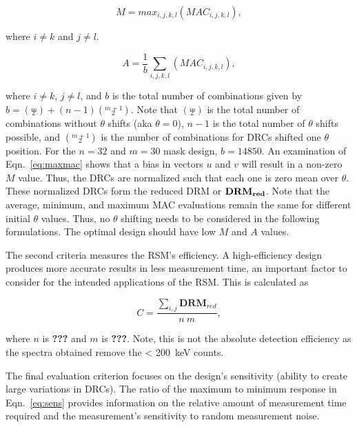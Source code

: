 \documentclass[3p,times]{elsarticle}
\begin{document}
\begin{equation}
M=max_{i,j,k,l}\left(MAC_{i,j,k,l}\right),
\label{eq:maxmac}
\end{equation}

\noindent where $i\neq k$ and $j\neq l$.

\begin{equation}
A=\frac{1}{b}\sum_{i,j,k,l}\left(MAC_{i,j,k,l}\right),
\label{eq:avgmac}
\end{equation}

where $i\neq k$, $j\neq l$, and $b$ is the total number of combinations given by $b=\left(\overset{m}{_2}\right)+(n-1)\left(\overset{m+1}{_2}\right)$.  
Note that $\left(\overset{m}{_2}\right)$ is the total number of combinations without $\theta$ shifts (aka $\theta=0$), $n-1$ is the total number of $\theta$ shifts possible, and $\left(\overset{m+1}{_2}\right)$ is the number of combinations for DRCs shifted one $\theta$ position.  
For the $n=32$ and $m=30$ mask design, $b=14850$.  
An examination of Eqn.~\ref{eq:maxmac} shows that a bias in vectors $u$ and $v$ will result in a non-zero $M$ value.  
Thus, the DRCs are normalized such that each one is zero mean over $\theta$.  
These normalized DRCs form the reduced DRM or $\bf{DRM_{red}}$. 
Note that the average, minimum, and maximum MAC evaluations remain the same for different initial $\theta$ values.  
Thus, no $\theta$ shifting needs to be considered in the following formulations. 
The optimal design should have low $M$ and $A$ values.

The second criteria measures the RSM's efficiency.  
A high-efficiency design produces more accurate results in less measurement time, an important factor to consider for the intended applications of the RSM.  
This is calculated as 

\begin{equation}
C=\frac{\sum_{i,j}\mathbf{DRM}_{red}}{n\ m},
\label{eq:avgcell}
\end{equation}

\noindent where $n$ is \textbf{???} and $m$ is \textbf{???}.
Note, this is not the absolute detection efficiency as the spectra obtained remove the < 200~keV counts.

The final evaluation criterion focuses on the design's sensitivity (ability to create large variations in DRCs).  
The ratio of the maximum to minimum response in Eqn.~\ref{eq:sens} provides information on the relative amount of measurement time required and the measurement's sensitivity to random measurement noise. 
\end{document}
